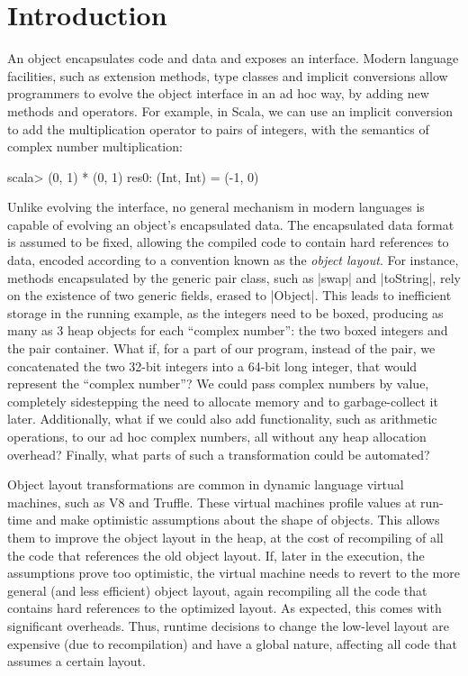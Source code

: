 \section{Introduction}
\label{sec:intro}

An object encapsulates code and data and exposes an interface. Modern
language facilities, such as extension methods, type classes and
implicit conversions allow programmers to evolve the object interface
in an ad hoc way, by adding new methods and operators. For example, in
Scala, we can use an implicit conversion to add the multiplication
operator to pairs of integers, with the semantics of complex number
multiplication:

\begin{lstlisting-nobreak}
scala> (0, 1) * (0, 1)
res0: (Int, Int) = (-1, 0)
\end{lstlisting-nobreak}

Unlike evolving the interface, no general mechanism in modern
languages is capable of evolving an object's encapsulated data. The
encapsulated data format is assumed to be fixed, allowing the compiled
code to contain hard references to data, encoded according to a convention known as the
\emph{object layout}. For instance, methods encapsulated
by the generic pair class, such as |swap| and |toString|, rely on the
existence of two generic fields, erased to |Object|. This leads to
inefficient storage in the running example, as the integers need to be boxed, producing as many as
3 heap objects for each ``complex number'': the two boxed integers and
the pair container. What if, for a part of  our program, instead of the pair, we
concatenated the two 32-bit integers into a 64-bit long integer, that
would represent the ``complex number''? We could pass complex numbers by value,
completely sidestepping the need to allocate memory and to garbage-collect it
later. Additionally, what if we could also add
functionality, such as arithmetic operations, to our ad hoc complex
numbers, all without any heap allocation overhead? Finally, what parts of such a
transformation could be automated? %

Object layout transformations are common in dynamic language virtual
machines, such as V8 and Truffle. These virtual machines profile
values at run-time and make optimistic assumptions about the shape of
objects. This allows them to improve the object layout
in the heap, at the cost of recompiling of all the code that references
the old object layout.
If, later in the execution, the assumptions prove too optimistic, the
virtual machine needs to revert to the more general (and less
efficient) object layout, again recompiling all the code that contains
hard references to the optimized layout. As expected, this comes with
significant overheads. Thus, runtime decisions to change the
low-level layout are expensive (due to recompilation) and
have a global nature, affecting all code that assumes a certain layout.

